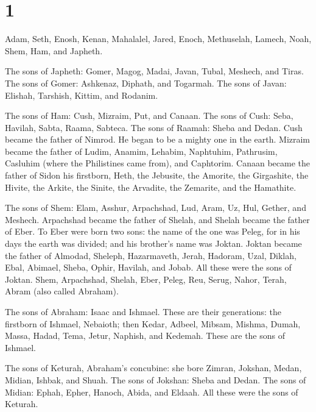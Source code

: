 \hypertarget{section}{%
\section{1}\label{section}}

 Adam, Seth, Enosh,  Kenan, Mahalalel,
Jared,  Enoch, Methuselah, Lamech,  Noah,
Shem, Ham, and Japheth.

 The sons of Japheth: Gomer, Magog, Madai, Javan, Tubal,
Meshech, and Tiras.  The sons of Gomer: Ashkenaz, Diphath,
and Togarmah.  The sons of Javan: Elishah, Tarshish,
Kittim, and Rodanim.

 The sons of Ham: Cush, Mizraim, Put, and Canaan.
 The sons of Cush: Seba, Havilah, Sabta, Raama, Sabteca.
The sons of Raamah: Sheba and Dedan.  Cush became the
father of Nimrod. He began to be a mighty one in the earth.
 Mizraim became the father of Ludim, Anamim, Lehabim,
Naphtuhim,  Pathrusim, Casluhim (where the Philistines
came from), and Caphtorim.  Canaan became the father of
Sidon his firstborn, Heth,  the Jebusite, the Amorite,
the Girgashite,  the Hivite, the Arkite, the Sinite,
 the Arvadite, the Zemarite, and the Hamathite.

 The sons of Shem: Elam, Asshur, Arpachshad, Lud, Aram,
Uz, Hul, Gether, and Meshech.  Arpachshad became the
father of Shelah, and Shelah became the father of Eber. 
To Eber were born two sons: the name of the one was Peleg, for in his
days the earth was divided; and his brother's name was Joktan.
 Joktan became the father of Almodad, Sheleph,
Hazarmaveth, Jerah,  Hadoram, Uzal, Diklah,
 Ebal, Abimael, Sheba,  Ophir, Havilah,
and Jobab. All these were the sons of Joktan.  Shem,
Arpachshad, Shelah,  Eber, Peleg, Reu, 
Serug, Nahor, Terah,  Abram (also called Abraham).

 The sons of Abraham: Isaac and Ishmael. 
These are their generations: the firstborn of Ishmael, Nebaioth; then
Kedar, Adbeel, Mibsam,  Mishma, Dumah, Massa, Hadad,
Tema,  Jetur, Naphish, and Kedemah. These are the sons of
Ishmael.

 The sons of Keturah, Abraham's concubine: she bore
Zimran, Jokshan, Medan, Midian, Ishbak, and Shuah. The sons of Jokshan:
Sheba and Dedan.  The sons of Midian: Ephah, Epher,
Hanoch, Abida, and Eldaah. All these were the sons of Keturah.

